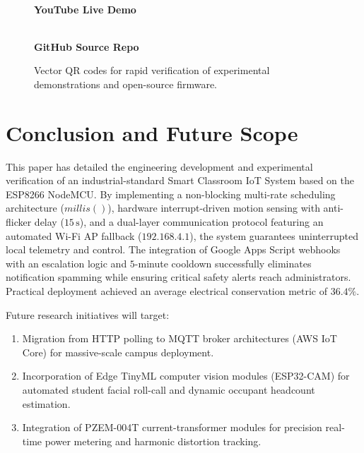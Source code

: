 \documentclass[conference]{IEEEtran}
\begin{document}
\begin{figure}[htbp]
\centering
\begin{minipage}{0.45\columnwidth}
    \centering
    \\[0.15cm]
    \tiny\textbf{YouTube Live Demo}
\end{minipage}
\hfill
\begin{minipage}{0.45\columnwidth}
    \centering
    \\[0.15cm]
    \tiny\textbf{GitHub Source Repo}
\end{minipage}
\caption{Vector QR codes for rapid verification of experimental demonstrations and open-source firmware.}
\label{fig:qr_codes}
\end{figure}

\section{Conclusion and Future Scope}
This paper has detailed the engineering development and experimental verification of an industrial-standard Smart Classroom IoT System based on the ESP8266 NodeMCU. By implementing a non-blocking multi-rate scheduling architecture ($millis()$), hardware interrupt-driven motion sensing with anti-flicker delay ($15\,\text{s}$), and a dual-layer communication protocol featuring an automated Wi-Fi AP fallback ($192.168.4.1$), the system guarantees uninterrupted local telemetry and control. The integration of Google Apps Script webhooks with an escalation logic and $5$-minute cooldown successfully eliminates notification spamming while ensuring critical safety alerts reach administrators. Practical deployment achieved an average electrical conservation metric of $36.4\%$.

Future research initiatives will target:
\begin{enumerate}
    \item Migration from HTTP polling to MQTT broker architectures (AWS IoT Core) for massive-scale campus deployment.
    \item Incorporation of Edge TinyML computer vision modules (ESP32-CAM) for automated student facial roll-call and dynamic occupant headcount estimation.
    \item Integration of PZEM-004T current-transformer modules for precision real-time power metering and harmonic distortion tracking.
\end{enumerate}
\end{document}
